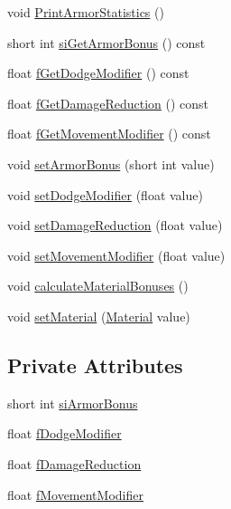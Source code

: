 \begin{DoxyCompactItemize}
\item 
void \mbox{\hyperlink{class_armor_a248a63d0d2801a10d6a4039f60b6a0c7}{Print\+Armor\+Statistics}} ()
\item 
short int \mbox{\hyperlink{class_armor_a72b3d5c0294e80243ed8c96dbc35ccc7}{si\+Get\+Armor\+Bonus}} () const
\item 
float \mbox{\hyperlink{class_armor_a2eab88550e74345eef13e2a279a2f995}{f\+Get\+Dodge\+Modifier}} () const
\item 
float \mbox{\hyperlink{class_armor_a2ac47305b38298494fae82c69c935fba}{f\+Get\+Damage\+Reduction}} () const
\item 
float \mbox{\hyperlink{class_armor_a788fee5745a82a7ffc587aa4938200dc}{f\+Get\+Movement\+Modifier}} () const
\item 
void \mbox{\hyperlink{class_armor_a14c15f72741f2a3dec28c746b3678c20}{set\+Armor\+Bonus}} (short int value)
\item 
void \mbox{\hyperlink{class_armor_ab48309e3f16d226d56af617c65350698}{set\+Dodge\+Modifier}} (float value)
\item 
void \mbox{\hyperlink{class_armor_a08f926ae8438bae04058c22b098c6fcf}{set\+Damage\+Reduction}} (float value)
\item 
void \mbox{\hyperlink{class_armor_a99475fc688add41f89b7fef160534e33}{set\+Movement\+Modifier}} (float value)
\item 
void \mbox{\hyperlink{class_armor_ac86ccbc735cc83849f1c62099285a0c9}{calculate\+Material\+Bonuses}} ()
\item 
void \mbox{\hyperlink{class_armor_a1710521cbba1bf9328e969cbbc8cdbf3}{set\+Material}} (\mbox{\hyperlink{class_material}{Material}} value)
\end{DoxyCompactItemize}
\subsection*{Private Attributes}
\begin{DoxyCompactItemize}
\item 
short int \mbox{\hyperlink{class_armor_a2ebccb72313c650ec1b8bafec4e82dc2}{si\+Armor\+Bonus}}
\item 
float \mbox{\hyperlink{class_armor_aed2f98ba9acefdb67ac75104c55ea266}{f\+Dodge\+Modifier}}
\item 
float \mbox{\hyperlink{class_armor_acc29c5818b294aaaa11d8d1621b7dd19}{f\+Damage\+Reduction}}
\item 
float \mbox{\hyperlink{class_armor_aa71e430d9308cfe64b5168014c063722}{f\+Movement\+Modifier}}
\end{DoxyCompactItemize}
